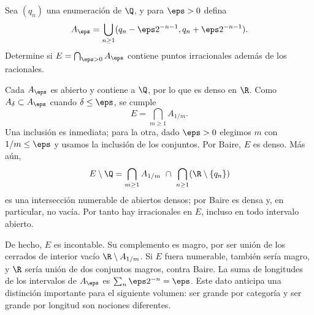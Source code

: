 \begin{ejercicio}\label{ej:lectura-10-8}
Sea $(q_n)$ una enumeración de $\Q$, y para $\eps>0$ defina
\[
 A_\eps=\bigcup_{n\geq1}(q_n-\eps2^{-n-1},q_n+\eps2^{-n-1}).
\]
Determine si $E=\bigcap_{\eps>0}A_\eps$ contiene puntos irracionales además de los racionales.
\end{ejercicio}
\begin{solucion}
Cada $A_\eps$ es abierto y contiene a $\Q$, por lo que es denso en $\R$. Como $A_\delta\subset A_\eps$ cuando $\delta\leq\eps$, se cumple
\[
 E=\bigcap_{m\geq1}A_{1/m}.
\]
Una inclusión es inmediata; para la otra, dado $\eps>0$ elegimos $m$ con $1/m\leq\eps$ y usamos la inclusión de los conjuntos. Por Baire, $E$ es denso. Más aún,
\[
 E\setminus\Q=\bigcap_{m\geq1}A_{1/m}\ \cap\ \bigcap_{n\geq1}(\R\setminus\{q_n\})
\]
es una intersección numerable de abiertos densos; por Baire es densa y, en particular, no vacía. Por tanto hay irracionales en $E$, incluso en todo intervalo abierto.

De hecho, $E$ es incontable. Su complemento es magro, por ser unión de los cerrados de interior vacío $\R\setminus A_{1/m}$. Si $E$ fuera numerable, también sería magro, y $\R$ sería unión de dos conjuntos magros, contra Baire. La suma de longitudes de los intervalos de $A_\eps$ es $\sum_n\eps2^{-n}=\eps$. Este dato anticipa una distinción importante para el siguiente volumen: ser grande por categoría y ser grande por longitud son nociones diferentes.
\end{solucion}

